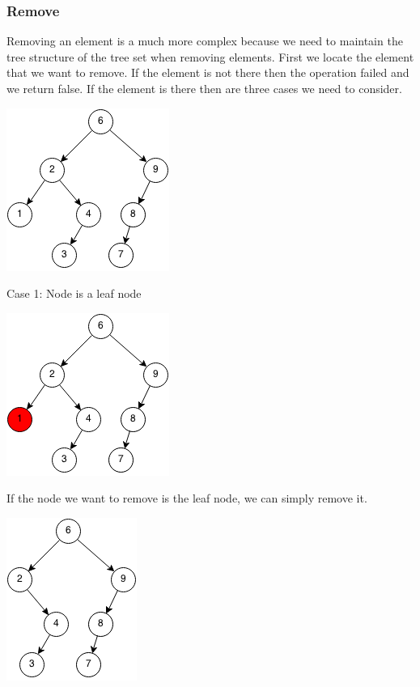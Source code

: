 \documentclass[11pt,oneside]{book}
\makeatletter
\def\maxwidth#1{\ifdim\Gin@nat@width>#1 #1\else\Gin@nat@width\fi}
\makeatother
\begin{document}
\subsubsection{Remove}

Removing an element is a much more complex because we need to maintain the tree structure of the tree set when removing elements. First we locate the element that we want to remove. If the element is not there then the operation failed and we return false. If the element is there then are three cases we need to consider.

\vspace{5px}\includegraphics[width=\maxwidth{\textwidth}]{bst-rem.png}

Case 1: Node is a leaf node

\vspace{5px}\includegraphics[width=\maxwidth{\textwidth}]{bst-rem-case11.png}

If the node we want to remove is the leaf node, we can simply remove it.

\vspace{5px}\includegraphics[width=\maxwidth{\textwidth}]{bst-rem-case12.png}
\end{document}
